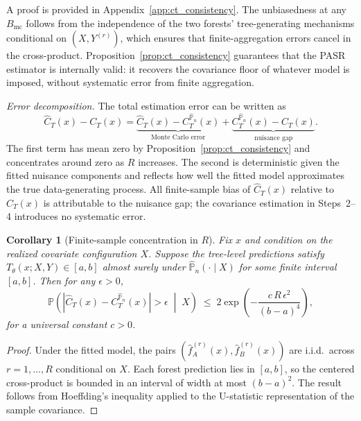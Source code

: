 \documentclass[11pt]{article}
\theoremstyle{plain}
\newtheorem{corollary}{Corollary}
\theoremstyle{definition}
\theoremstyle{remark}
\begin{document}
A proof is provided in Appendix~\ref{app:ct_consistency}. The unbiasedness at any $B_{\mathrm{mc}}$ follows from the independence of the two forests' tree-generating mechanisms conditional on $(X, Y^{(r)})$, which ensures that finite-aggregation errors cancel in the cross-product. Proposition~\ref{prop:ct_consistency} guarantees that the PASR estimator is internally valid: it recovers the covariance floor of whatever model is imposed, without systematic error from finite aggregation.

\medskip
\noindent\textit{Error decomposition.}\quad
The total estimation error can be written as
\begin{equation}
	\label{eq:error_decomp}
	\widehat C_T(x) - C_T(x) = \underbrace{\widehat C_T(x) - C_T^{\widehat{\mathbb P}_n}(x)}_{\text{Monte Carlo error}} + \underbrace{C_T^{\widehat{\mathbb P}_n}(x) - C_T(x)}_{\text{nuisance gap}}.
\end{equation}
The first term has mean zero by Proposition~\ref{prop:ct_consistency} and concentrates around zero as $R$ increases. The second is deterministic given the fitted nuisance components and reflects how well the fitted model approximates the true data-generating process. All finite-sample bias of $\widehat{C}_T(x)$ relative to $C_T(x)$ is attributable to the nuisance gap; the covariance estimation in Steps~2--4 introduces no systematic error.

\begin{corollary}[Finite-sample concentration in $R$]
	\label{cor:concentration}
	Fix $x$ and condition on the realized covariate configuration $X$. Suppose the tree-level predictions satisfy $T_\theta(x;X,Y)\in[a,b]$ almost surely under $\widehat{\mathbb P}_n(\cdot\mid X)$ for some finite interval $[a,b]$. Then for any $\epsilon>0$,
	\[
	\mathbb P\!\left( \left|\widehat C_T(x) - C_T^{\widehat{\mathbb P}_n}(x)\right| > \epsilon \;\middle|\; X \right) \;\le\; 2\exp\!\left( -\frac{c\,R\,\epsilon^2}{(b-a)^4} \right),
	\]
	for a universal constant $c>0$.
\end{corollary}

\begin{proof}
	Under the fitted model, the pairs $(\widehat f_A^{(r)}(x), \widehat f_B^{(r)}(x))$ are i.i.d.\ across $r=1,\ldots,R$ conditional on $X$. Each forest prediction lies in $[a,b]$, so the centered cross-product is bounded in an interval of width at most $(b-a)^2$. The result follows from Hoeffding's inequality applied to the U-statistic representation of the sample covariance.
\end{proof}
\end{document}
